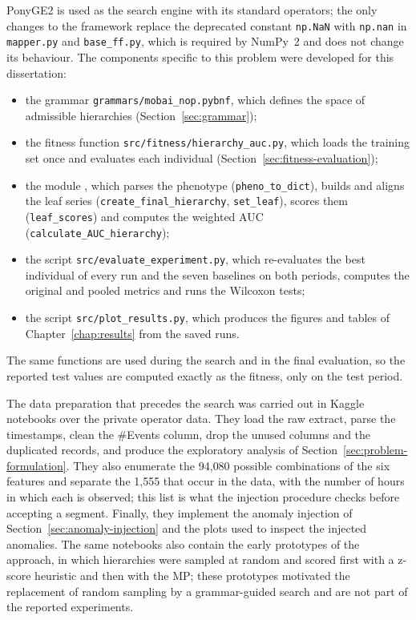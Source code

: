 PonyGE2 is used as the search engine with its standard operators; the only changes to the framework replace the deprecated constant \texttt{np.NaN} with \texttt{np.nan} in \texttt{mapper.py} and \texttt{base\_ff.py}, which is required by NumPy~2 and does not change its behaviour.
The components specific to this problem were developed for this dissertation:
\begin{itemize}
    \item the grammar \texttt{grammars/mobai\_nop.pybnf}, which defines the space of admissible hierarchies (Section~\ref{sec:grammar});
    \item the fitness function \texttt{src/fitness/hierarchy\_auc.py}, which loads the training set once and evaluates each individual (Section~\ref{sec:fitness-evaluation});
    \item \sloppy the module , which parses the phenotype (\texttt{pheno\_to\_dict}), builds and aligns the leaf series (\texttt{create\_final\_hierarchy}, \texttt{set\_leaf}), scores them (\texttt{leaf\_scores}) and computes the weighted \ac{AUC} (\texttt{calculate\_AUC\_hierarchy});
    \item the script \texttt{src/evaluate\_experiment.py}, which re-evaluates the best individual of every run and the seven baselines on both periods, computes the original and pooled metrics and runs the Wilcoxon tests;
    \item the script \texttt{src/plot\_results.py}, which produces the figures and tables of Chapter~\ref{chap:results} from the saved runs.
\end{itemize}
The same functions are used during the search and in the final evaluation, so the reported test values are computed exactly as the fitness, only on the test period.

The data preparation that precedes the search was carried out in Kaggle notebooks over the private operator data.
They load the raw extract, parse the timestamps, clean the \#Events column, drop the unused columns and the duplicated records, and produce the exploratory analysis of Section~\ref{sec:problem-formulation}.
They also enumerate the 94{,}080 possible combinations of the six features and separate the 1{,}555 that occur in the data, with the number of hours in which each is observed; this list is what the injection procedure checks before accepting a segment.
Finally, they implement the anomaly injection of Section~\ref{sec:anomaly-injection} and the plots used to inspect the injected anomalies.
The same notebooks also contain the early prototypes of the approach, in which hierarchies were sampled at random and scored first with a z-score heuristic and then with the \ac{MP}; these prototypes motivated the replacement of random sampling by a grammar-guided search and are not part of the reported experiments.

